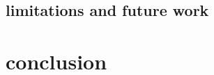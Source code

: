 \documentclass[manuscript,screen,review]{acmart}
\begin{document}
\subsection{limitations and future work}

\section{conclusion}








%
%
%
%
%
%
%
%
\end{document}
